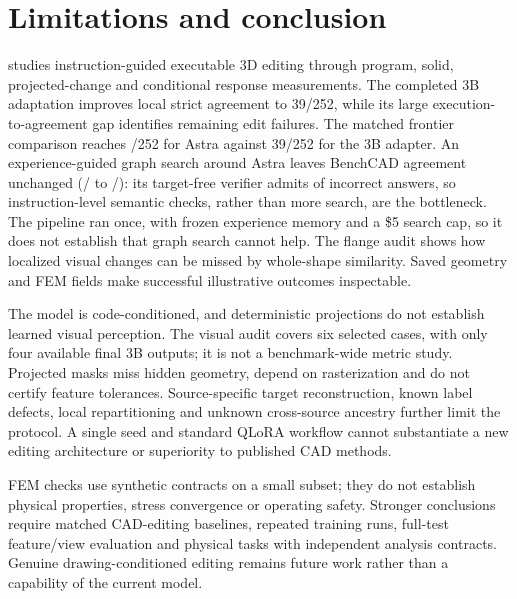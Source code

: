 \section{Limitations and conclusion}
\label{sec:conclusion}
\ours studies instruction-guided executable 3D editing through program, solid, projected-change and conditional response measurements. The completed 3B adaptation improves local strict agreement to 39/252, while its large execution-to-agreement gap identifies remaining edit failures. The matched frontier comparison reaches \paAstra/252 for Astra against 39/252 for the 3B adapter. An experience-guided graph search around Astra leaves BenchCAD agreement unchanged (\pipeAstra/\pipeN{} to \pipeFull/\pipeN): its target-free verifier admits \pipeWrongPass{} of \pipeWrong{} incorrect answers, so instruction-level semantic checks, rather than more search, are the bottleneck. The pipeline ran once, with frozen experience memory and a \$5 search cap, so it does not establish that graph search cannot help. The flange audit shows how localized visual changes can be missed by whole-shape similarity. Saved geometry and FEM fields make successful illustrative outcomes inspectable.

The model is code-conditioned, and deterministic projections do not establish learned visual perception. The visual audit covers six selected cases, with only four available final 3B outputs; it is not a benchmark-wide metric study. Projected masks miss hidden geometry, depend on rasterization and do not certify feature tolerances. Source-specific target reconstruction, known label defects, local repartitioning and unknown cross-source ancestry further limit the protocol. A single seed and standard QLoRA workflow cannot substantiate a new editing architecture or superiority to published CAD methods.

FEM checks use synthetic contracts on a small subset; they do not establish physical properties, stress convergence or operating safety. Stronger conclusions require matched CAD-editing baselines, repeated training runs, full-test feature/view evaluation and physical tasks with independent analysis contracts. Genuine drawing-conditioned editing remains future work rather than a capability of the current model.
